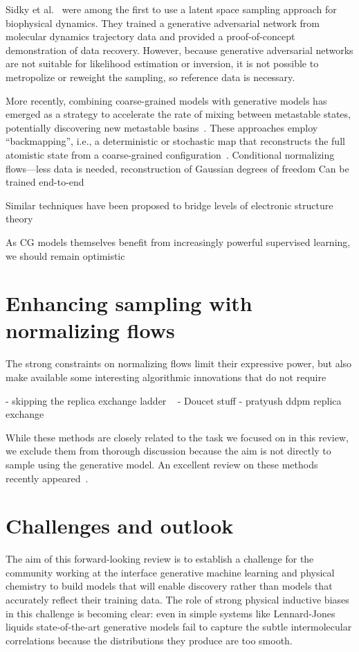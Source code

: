 \documentclass[11pt]{article}
\begin{document}
Sidky et al.~\cite{sidky_molecular_2020} were among the first to use a latent space sampling approach for biophysical dynamics.
They trained a generative adversarial network from molecular dynamics trajectory data and provided a proof-of-concept demonstration of data recovery.
However, because generative adversarial networks are not suitable for likelihood estimation or inversion, it is not possible to metropolize or reweight the sampling, so reference data is necessary.


More recently, combining coarse-grained models with generative models has emerged as a strategy to accelerate the rate of mixing between metastable states, potentially discovering new metastable basins~\cite{chennakesavalu_ensuring_2023}.
These approaches employ ``backmapping'', i.e., a deterministic or stochastic map that reconstructs the full atomistic state from a coarse-grained configuration~\cite{dunbrack_jr_bayesian_1997, bower_prediction_1997}.
Conditional normalizing flows---less data is needed, reconstruction of Gaussian degrees of freedom
Can be trained end-to-end

Similar techniques have been proposed to bridge levels of electronic structure theory~\cite{maier_bypassing_2022}

As CG models themselves benefit from increasingly powerful supervised learning, we should remain optimistic~\cite{wang_machine_2019, husic_coarse_2020}

\section{Enhancing sampling with normalizing flows}
The strong constraints on normalizing flows limit their expressive power, but also make available some interesting algorithmic innovations that do not require 

- skipping the replica exchange ladder ~\cite{invernizzi_skipping_2022}
- Doucet stuff
- pratyush ddpm replica exchange 

While these methods are closely related to the task we focused on in this review, we exclude them from thorough discussion because the aim is not directly to sample using the generative model.
An excellent review on these methods recently appeared~\cite{mehdi_enhanced_2023}.

\section{Challenges and outlook}

The aim of this forward-looking review is to establish a challenge for the community working at the interface generative machine learning and physical chemistry to build models that will enable discovery rather than models that accurately reflect their training data. 
The role of strong physical inductive biases in this challenge is becoming clear: even in simple systems like Lennard-Jones liquids state-of-the-art generative models fail to capture the subtle intermolecular correlations because the distributions they produce are too smooth.



  
 
\end{document}
